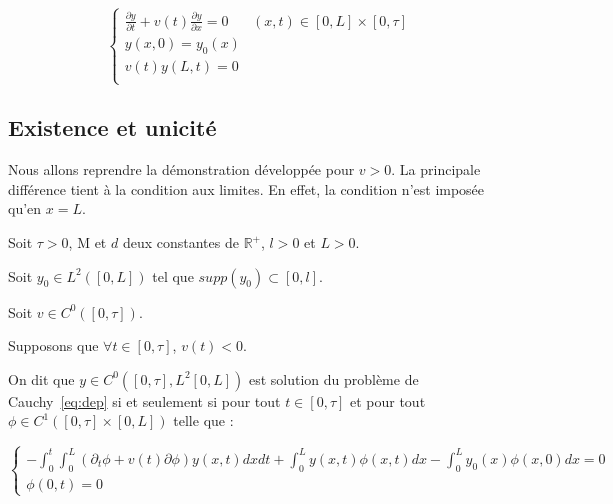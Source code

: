 \documentclass[a4paper]{article}
\newcommand{\mass}{\mathrm{M}}
\newcommand{\dep}{d}
\begin{document}
\begin{equation}
		\label{eq:dep}
		\begin{cases}
			\displaystyle \frac{\partial y}{\partial t}+ v(t) \frac{\partial y} {\partial x}  = 0 & (x,t) \in [0,L] \times [0, \tau] \\
             y(x,0) = y_{0} (x) \\
			 v(t)y(L,t) = 0 \\
		\end{cases}
\end{equation}



\subsection{Existence et unicité}

Nous allons reprendre la démonstration développée pour $v>0$.
La principale différence tient à la condition aux limites.
En effet, la condition n'est imposée qu'en $x=L$.

\begin{definition}
	\label{def:cauchyd}
	Soit $\tau>0$, $\mass$ et $\dep$ deux constantes de $\mathbb{R}^+$, 
	$l>0$ et $L>0$. 
	
	Soit $y_0 \in L^2([0,L])$ tel que $supp(y_0) \subset [0,l]$.
	
	Soit $v \in C^0([0,\tau])$.
	
	Supposons que $\forall t \in[0,\tau]$, $v(t)<0$.
	
	On dit que $y \in C^0([0,\tau],L^2[0,L])$ est solution du problème de Cauchy~\eqref{eq:dep}  
	si et seulement si pour tout $t \in [0,\tau]$ et pour
	tout $\phi \in C^1([0,\tau]\times [0,L])$ telle que :
	
	\begin{equation}
		\begin{cases}
			-\int_0^t \int_0^L (\partial_t \phi +v(t)\partial \phi) y(x,t) dxdt 
			+ \int_0^L y(x,t) \phi (x,t) dx - \int_0^L y_0(x)\phi(x,0)dx =0 \\
			\phi(0,t)=0
		\end{cases}
	\end{equation}
	
\end{definition}
\end{document}
